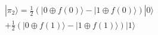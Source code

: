 \documentclass[preview]{standalone}
\begin{document}
\begin{align*}
|\pi_2\rangle = \frac{1}{2} (|0 \oplus f(0) \rangle - |1 \oplus f(0) \rangle) |0\rangle \\ + \frac{1}{2}(|0\oplus f(1) \rangle - |1 \oplus f(1) \rangle)|1\rangle
\end{align*}
\end{document}
